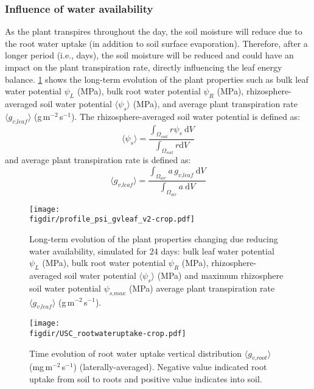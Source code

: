 \subsubsection*{Influence of water availability}

As the plant transpires throughout the day, the soil moisture will reduce due to the root water uptake (in addition to soil surface evaporation). Therefore, after a longer period (i.e., days), the soil moisture will be reduced and could have an impact on the plant transpiration rate, directly influencing the leaf energy balance. \cref{fig:profile_psi_gvleaf} shows the long-term evolution of the plant properties such as bulk leaf water potential $\psi_L$ (MPa), bulk root water potential $\psi_R$ (MPa), rhizosphere-averaged soil water potential $\langle \psi_s \rangle$ (MPa), and average plant transpiration rate $\langle g_{\textit{v,leaf}} \rangle$ (g\,m$^{-2}$\,s$^{-1}$). The rhizosphere-averaged soil water potential is defined as:
\begin{equation}
\langle \psi_s \rangle = \frac{\int_{\Omega_{\textit{soil}}} r \psi_s~\mathrm{d}V}{\int_{\Omega_{\textit{soil}}} r \mathrm{d}V }
\end{equation}
and average plant transpiration rate is defined as:
\begin{equation}
\langle g_{\textit{v,leaf}} \rangle= \frac{\int_{\Omega_{\textit{air}}} a\, g_{\textit{v,leaf}}~\mathrm{d}V}{\int_{\Omega_{\textit{air}}} a~\mathrm{d}V }
\end{equation}


\begin{figure}[p]
	\centering
	\texttt{[image: \\figdir/profile\_psi\_gvleaf\_v2-crop.pdf]}
	\caption{Long-term evolution of the plant properties changing due reducing water availability, simulated for 24 days:  bulk leaf water potential $\psi_L$ (MPa), bulk root water potential $\psi_R$ (MPa), rhizosphere-averaged soil water potential $\langle \psi_s \rangle$ (MPa) and maximum rhizosphere soil water potential $\psi_{\textit{s,max}}$ (MPa)  average plant transpiration rate $\langle g_{\textit{v,leaf}} \rangle$ (g\,m$^{-2}$\,s$^{-1}$). }
	\label{fig:profile_psi_gvleaf}
\end{figure}

\begin{sidewaysfigure}[p]
	\centering
	\texttt{[image: \\figdir/USC\_rootwateruptake-crop.pdf]}
	\caption{Time evolution of root water uptake vertical distribution $\langle g_{\textit{v,root}} \rangle$ (mg\,m$^{-2}$\,s$^{-1}$) (laterally-averaged). Negative value indicated root uptake from soil to roots and positive value indicates into soil.}
	\label{fig:USC_rootwateruptake}
\end{sidewaysfigure}

